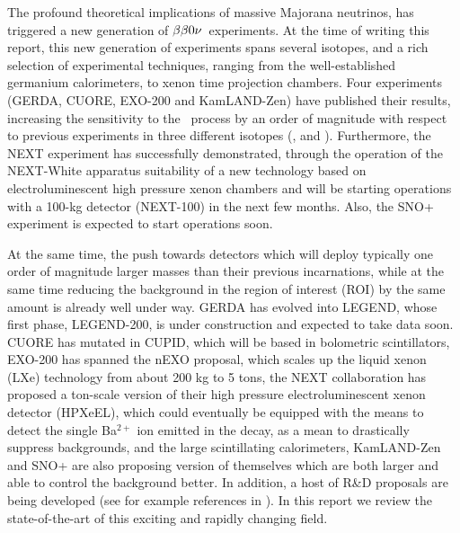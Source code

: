 The profound theoretical implications of massive Majorana neutrinos, 
has triggered a new generation of $\beta\beta0\nu$~experiments. At the time of writing this report, this new generation of experiments spans several isotopes, and a rich selection of experimental techniques, ranging from the well-established germanium calorimeters, to xenon time projection chambers. Four experiments (GERDA, CUORE, EXO-200 and KamLAND-Zen) have published their results, increasing the sensitivity to the \bbonu\ process by an order of magnitude with respect to previous experiments in three different isotopes (,  and ). Furthermore, the NEXT experiment has successfully demonstrated, through the operation of the NEXT-White apparatus suitability of a new technology based on electroluminescent high pressure xenon chambers and will be starting operations with a 100-kg detector (NEXT-100) in the next few months. Also, the SNO+ experiment is expected to start operations soon. 

At the same time, the push towards detectors which will deploy typically one order of magnitude larger masses than their previous incarnations, while at the same time reducing the background in the region of interest (ROI) by the same amount is already well under way. GERDA has evolved into LEGEND, whose first phase, LEGEND-200, is under construction and expected to take data soon. CUORE has mutated in CUPID, which will be based in bolometric scintillators, EXO-200 has spanned the nEXO proposal, which scales up the liquid xenon (LXe) technology from about 200 kg to 5 tons, the NEXT collaboration has proposed a ton-scale version of their high pressure electroluminescent xenon detector (HPXeEL), which could eventually be equipped with the means to detect the single Ba$^{2+}$ ion emitted in the decay, as a mean to drastically suppress backgrounds, and the large scintillating calorimeters, KamLAND-Zen and SNO+ are also proposing version of themselves which are both larger and able to control the background better. In addition, a host of R\&D proposals are being developed (see for example references in \cite{Dell_Oro_2016}). 
In this report we review the state-of-the-art of this exciting and rapidly changing field. 

